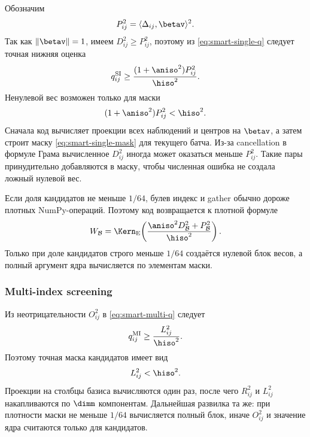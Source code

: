 Обозначим
\begin{equation}
    P_{ij}^2=\langle\Delta_{ij},\betav\rangle^2.
\end{equation}
Так как $\|\betav\|=1$, имеем $D_{ij}^2\geq P_{ij}^2$, поэтому
из \eqref{eq:smart-single-q} следует точная нижняя оценка
\begin{equation}
    q_{ij}^{\mathrm{SI}}
    \geq
    \frac{(1+\aniso^2)P_{ij}^2}{\hiso^2}.
\end{equation}
Ненулевой вес возможен только для маски
\begin{equation}
    (1+\aniso^2)P_{ij}^2<\hiso^2.
\label{eq:smart-single-mask}
\end{equation}
Сначала код вычисляет проекции всех наблюдений и центров на
$\betav$, а затем строит маску \eqref{eq:smart-single-mask} для
текущего батча. Из-за cancellation в формуле Грама вычисленное
$D_{ij}^2$ иногда может оказаться меньше $P_{ij}^2$. Такие пары
принудительно добавляются в маску, чтобы численная ошибка не создала
ложный нулевой вес.

Если доля кандидатов не меньше $1/64$, булев индекс и gather обычно
дороже плотных NumPy-операций. Поэтому код возвращается к плотной
формуле
\begin{equation}
    W_{\mathcal B}
    =
    \Kern_{\mathrm E}\!\left(
        \frac{\aniso^2D_{\mathcal B}^2+P_{\mathcal B}^2}
             {\hiso^2}
    \right).
\end{equation}
Только при доле кандидатов строго меньше $1/64$ создаётся нулевой
блок весов, а полный аргумент ядра вычисляется по элементам маски.

\subsubsection{Multi-index screening}

Из неотрицательности $O_{ij}^2$ в
\eqref{eq:smart-multi-q} следует
\begin{equation}
    q_{ij}^{\mathrm{MI}}
    \geq\frac{L_{ij}^2}{\hiso^2}.
\end{equation}
Поэтому точная маска кандидатов имеет вид
\begin{equation}
    L_{ij}^2<\hiso^2.
\label{eq:smart-multi-mask}
\end{equation}
Проекции на столбцы базиса вычисляются один раз, после чего
$R_{ij}^2$ и $L_{ij}^2$ накапливаются по $\dimm$ компонентам.
Дальнейшая развилка та же: при плотности маски не меньше $1/64$
вычисляется полный блок, иначе $O_{ij}^2$ и значение ядра считаются
только для кандидатов.

